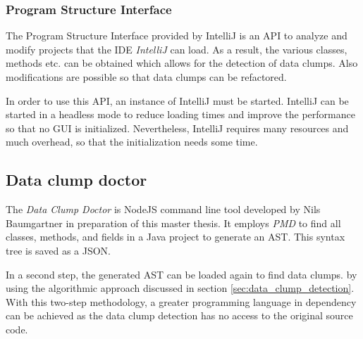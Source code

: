 \subsubsection{ Program Structure Interface}\label{sec:psi}
The Program Structure Interface provided by IntelliJ is an \ac{API} to analyze and modify  projects that the \ac{IDE} \textit{IntelliJ} can load. As a result, the various classes, methods etc. can be obtained which allows for the detection of data clumps. Also modifications are possible so that data clumps can be refactored.

In order to use this API, an instance of IntelliJ must be started. IntelliJ can be started in a headless mode to reduce loading times and improve the performance so that no GUI is initialized. Nevertheless, IntelliJ requires many resources and much overhead, so that  the initialization needs some time.



\subsection{Data clump doctor} \label{sec:data_clump_doctor}

The  \textit{Data Clump Doctor} is NodeJS command line tool developed by Nils Baumgartner in preparation of this master thesis. It employs \textit{PMD} to find all classes, methods, and fields in a Java project to generate an \ac{AST}. This syntax tree is saved as a \ac{JSON}. 

In a second step, the generated \ac{AST} can be loaded again to find data clumps. by using the algorithmic approach discussed in section \ref{sec:data_clump_detection}. With this two-step methodology, a greater programming language in dependency can be achieved as the data clump detection has no access to the original source code. 





